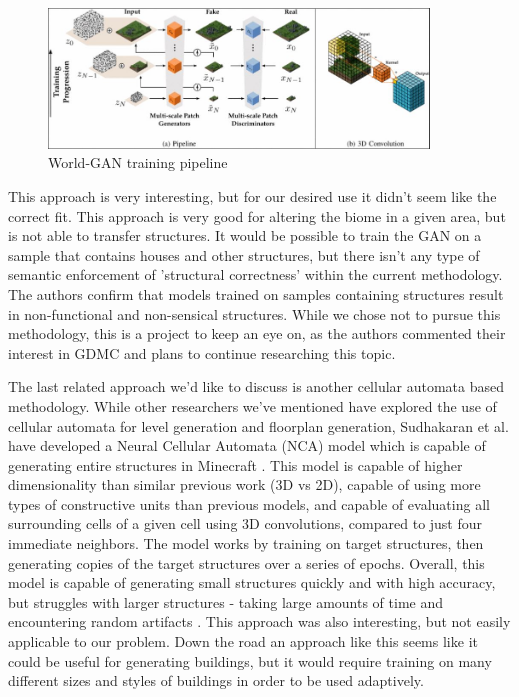 \documentclass[11pt, oneside]{article}
\begin{document}
\begin{normalsize}
\begin{figure}[H]
\centering
\includegraphics[width=0.9\textwidth]{gan}
\caption{World-GAN training pipeline \cite{awiszus2021world}}
\label{fig:gan}
\end{figure}

This approach is very interesting, but for our desired use it didn't seem like the correct fit. This approach is very good for altering the biome in a given area, but is not able to transfer structures. It would be possible to train the GAN on a sample that contains houses and other structures, but there isn't any type of semantic enforcement of 'structural correctness' within the current methodology. The authors confirm that models trained on samples containing structures result in non-functional and non-sensical structures. While we chose not to pursue this methodology, this is a project to keep an eye on, as the authors commented their interest in GDMC and plans to continue researching this topic.

The last related approach we'd like to discuss is another cellular automata based methodology. While other researchers we've mentioned have explored the use of cellular automata for level generation and floorplan generation, Sudhakaran et al. have developed a Neural Cellular Automata (NCA) model which is capable of generating entire structures in Minecraft \cite{sudhakaran2021growing}. This model is capable of higher dimensionality than similar previous work (3D vs 2D),  capable of using more types of constructive units than previous models, and capable of evaluating all surrounding cells of a given cell using 3D convolutions, compared to just four immediate neighbors. The model works by training on target structures, then generating copies of the target structures over a series of epochs. Overall, this model is capable of generating small structures quickly and with high accuracy, but struggles with larger structures - taking large amounts of time and encountering random artifacts \cite{sudhakaran2021growing}. This approach was also interesting, but not easily applicable to our problem. Down the road an approach like this seems like it could be useful for generating buildings, but it would require training on many different sizes and styles of buildings in order to be used adaptively.



\end{normalsize}
\end{document}
